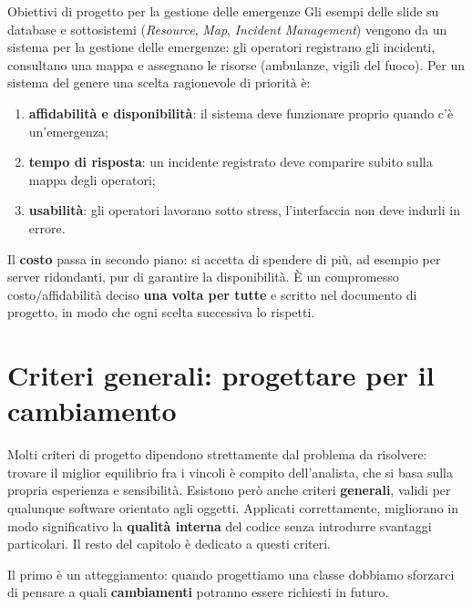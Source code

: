 \begin{esempio}{Obiettivi di progetto per la gestione delle emergenze}
Gli esempi delle slide su database e sottosistemi (\textit{Resource}, \textit{Map}, \textit{Incident Management}) vengono da
un sistema per la gestione delle emergenze: gli operatori registrano gli incidenti, consultano una mappa e assegnano le
risorse (ambulanze, vigili del fuoco). Per un sistema del genere una scelta ragionevole di priorità è:
\begin{enumerate}
  \item \textbf{affidabilità e disponibilità}: il sistema deve funzionare proprio quando c'è un'emergenza;
  \item \textbf{tempo di risposta}: un incidente registrato deve comparire subito sulla mappa degli operatori;
  \item \textbf{usabilità}: gli operatori lavorano sotto stress, l'interfaccia non deve indurli in errore.
\end{enumerate}
Il \textbf{costo} passa in secondo piano: si accetta di spendere di più, ad esempio per server ridondanti, pur di garantire
la disponibilità. È un compromesso costo/affidabilità deciso \textbf{una volta per tutte} e scritto nel documento di
progetto, in modo che ogni scelta successiva lo rispetti.
\end{esempio}

\section{Criteri generali: progettare per il cambiamento}

Molti criteri di progetto dipendono strettamente dal problema da risolvere: trovare il miglior equilibrio fra i vincoli è
compito dell'analista, che si basa sulla propria esperienza e sensibilità. Esistono però anche criteri \textbf{generali},
validi per qualunque software orientato agli oggetti. Applicati correttamente, migliorano in modo significativo la
\textbf{qualità interna} del codice senza introdurre svantaggi particolari. Il resto del capitolo è dedicato a questi
criteri.

Il primo è un atteggiamento: quando progettiamo una classe dobbiamo sforzarci di pensare a quali \textbf{cambiamenti}
potranno essere richiesti in futuro.


